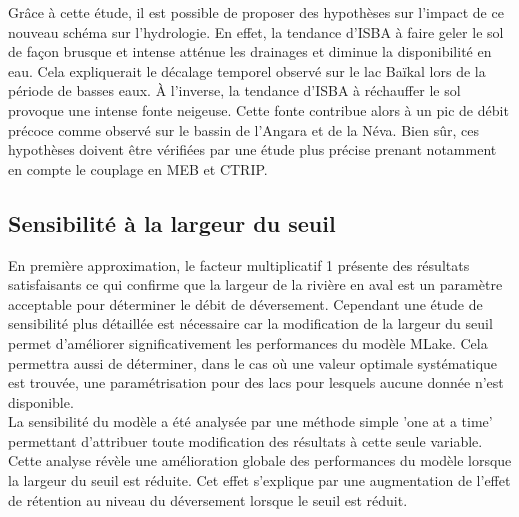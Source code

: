 Grâce à cette étude, il est possible de proposer des hypothèses sur l'impact de ce nouveau schéma sur l'hydrologie. En effet, la tendance d'ISBA à faire geler le sol de façon brusque et intense atténue les drainages et diminue la disponibilité en eau. Cela expliquerait le décalage temporel observé sur le lac Baïkal lors de la période de basses eaux. À l'inverse, la tendance d'ISBA à réchauffer le sol provoque une intense fonte neigeuse. Cette fonte contribue alors à un pic de débit précoce comme observé sur le bassin de l'Angara et de la Néva. Bien sûr, ces hypothèses doivent être vérifiées par une étude plus précise prenant notamment en compte le couplage en MEB et CTRIP.


\subsection{{\selectfont Sensibilité à la largeur du seuil}}

En première approximation, le facteur multiplicatif 1 présente des résultats satisfaisants ce qui confirme que la largeur de la rivière en aval est un paramètre acceptable pour déterminer le débit de déversement. Cependant une étude de sensibilité plus détaillée est nécessaire car la modification de la largeur du seuil permet d'améliorer significativement les performances du modèle MLake. Cela permettra aussi de déterminer, dans le cas où une valeur optimale systématique est trouvée, une paramétrisation pour des lacs pour lesquels aucune donnée n'est disponible.\\
La sensibilité du modèle a été analysée par une méthode simple 'one at a time' permettant d'attribuer toute modification des résultats à cette seule variable.\\
Cette analyse révèle une amélioration globale des performances du modèle lorsque la largeur du seuil est réduite. Cet effet s'explique par une augmentation de l'effet de rétention au niveau du déversement lorsque le seuil est réduit. \\

